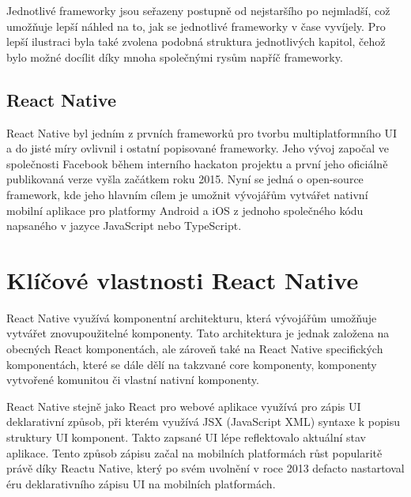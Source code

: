 Jednotlivé frameworky jsou seřazeny postupně od nejstaršího
po nejmladší, což umožňuje lepší náhled na to, jak se jednotlivé frameworky v čase vyvíjely. Pro lepší ilustraci byla také zvolena 
podobná struktura jednotlivých kapitol, čehož bylo možné docílit díky mnoha společnými rysům napříč frameworky.

\subsection{React Native}
React Native byl jedním z prvních frameworků pro tvorbu multiplatformního UI a do jisté míry ovlivnil i ostatní popisované
frameworky. Jeho vývoj započal ve společnosti Facebook během interního hackaton projektu a první jeho oficiálně publikovaná
verze vyšla začátkem roku 2015. \cite{reactNativeHistory}
Nyní se jedná o open-source framework, kde jeho hlavním cílem je umožnit vývojářům vytvářet nativní mobilní aplikace 
pro platformy Android a iOS z jednoho společného kódu napsaného v jazyce JavaScript nebo TypeScript.

\section*{Klíčové vlastnosti React Native}

React Native využívá komponentní architekturu, která vývojářům umožňuje 
vytvářet znovupoužitelné komponenty. \cite{reactNativeComponents} Tato architektura je jednak založena na obecných
React komponentách, ale zároveň také na React Native specifických komponentách, které se dále dělí na takzvané core
komponenty, komponenty vytvořené komunitou či vlastní nativní komponenty. \cite{reactNativeComponents}

    
React Native stejně jako React pro webové aplikace využívá pro zápis UI deklarativní způsob, 
při kterém využívá JSX (JavaScript XML) syntaxe k popisu struktury UI komponent. \cite{reactNativeJSX}
Takto zapsané UI lépe reflektovalo aktuální stav aplikace.
Tento způsob zápisu začal na mobilních platformách růst popularitě právě díky Reactu Native, který po svém uvolnění v roce 2013 
defacto nastartoval éru deklarativního zápisu UI na mobilních platformách. \cite{declarativeUIHistory}

